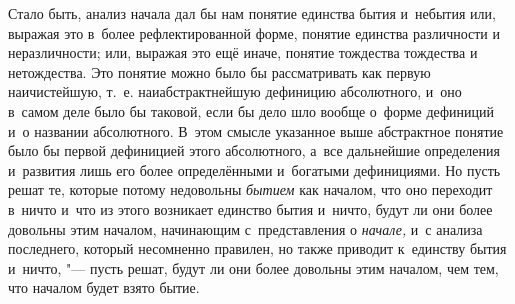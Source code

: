 Стало быть, анализ начала дал бы нам понятие единства бытия и~небытия или,
выражая это в~более рефлектированной форме, понятие единства различности и
неразличности; или, выражая это ещё иначе, понятие тождества тождества и
нетождества. Это понятие можно было бы рассматривать
как первую наичистейшую, т.~е. наиабстрактнейшую дефиницию абсолютного, и~оно
в~самом деле было бы таковой, если бы дело шло вообще о~форме дефиниций и~о
названии абсолютного. В~этом смысле указанное выше абстрактное понятие было бы
первой дефиницией этого абсолютного, а~все дальнейшие определения и~развития
лишь его более определёнными и~богатыми дефинициями. Но пусть решат те, которые
потому недовольны {\em бытием} как началом, что оно переходит в~ничто и~что из
этого возникает единство бытия и~ничто, будут ли они более довольны этим
началом, начинающим с~представления о {\em начале,} и~с анализа последнего,
который несомненно правилен, но также приводит к~единству бытия и~ничто, "---
пусть решат, будут ли они более довольны этим началом, чем тем, что началом
будет взято бытие.

